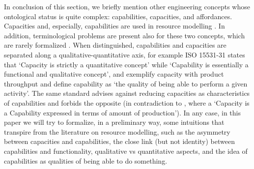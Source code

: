\documentclass[sw]{iosart2x}
\newcommand{\quotes}[1]{`#1'}
\newcommand{\myComment}[1]{{\unskip \ignorespaces}}
\begin{document}
\medskip
In conclusion of this section, we briefly mention \myComment{very briefly some facts about some} other engineering concepts \myComment{of complex} whose ontological status is quite complex: capabilities, capacities, and affordances. 
Capacities and, especially, capabilities are used in resource modelling \cite{jarvenpaaDevelopmentOntologyDescribing2019a, sarkarOntologyModelProcess2019, jochemISOISO15531312004, solanoKnowledgeRepresentationProduct2014}. In addition, terminological problems are present also for these two concepts, which are rarely formalized \cite{sanfilippoResourcesManufacturing2015, borgoCapabilitiesCapacitiesFunctionalities2021}. When distinguished, capabilities and capacities are separated along a qualitative-quantitative axis, for example ISO 15531-31\cite{jochemISOISO15531312004} states that \quotes{Capacity is strictly a quantitative concept} while \quotes{Capability is essentially a functional and qualitative concept}, and exemplify capacity with product throughput and define capability as \quotes{the quality of being able to perform a given activity}. The same standard advises against reducing capacities as characteristics of capabilities and forbids the opposite (in contradiction to \cite{solanoKnowledgeRepresentationProduct2014}, where a \quotes{Capacity is a Capability
expressed in terms of amount of production}).
In any case, in this paper we will try to formalize, in a preliminary way, some intuitions that transpire from the literature on resource modelling, such as the asymmetry between capacities and capabilities, the close link (but not identity) between capabilities and functionality, qualitative vs quantitative aspects, and the idea of capabilities as qualities of being able to do something.
\end{document}
